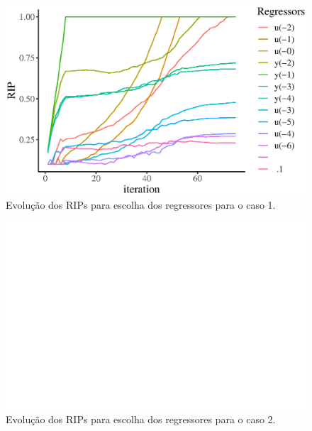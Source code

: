 \begin{exmp}
\begin{figure}[H]
    \centering
    \includegraphics{Figs/sis2aord_l_ramss_RIPs.eps}
    \caption{Evolução dos RIPs para escolha dos regressores para o caso 1.}
    \label{fig:sis2aord_RIPs_caso1}
\end{figure}
\begin{figure}[H]
    \centering
    \includegraphics{Figs/sis2aord_nl_ramss_RIPs.eps}
    \caption{Evolução dos RIPs para escolha dos regressores para o caso 2.}
    \label{fig:sis2aord_RIPs_caso2}
\end{figure}




\end{exmp}
